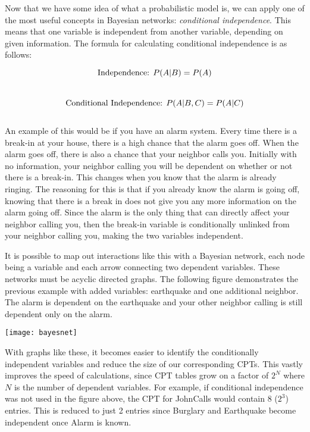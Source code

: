Now that we have some idea of what a probabilistic model is, we can apply one of the most useful concepts in Bayesian networks: \textit{conditional independence}. This means that one variable is independent from another variable, depending on given information. The formula for calculating conditional independence is as follows:\par

\begin{equation}
  \textnormal{Independence: }
  P(A|B) = P(A)
\end{equation} \\[\eqnspace]
\begin{equation}
  \textnormal{Conditional Independence: }
  P(A|B,C) = P(A|C)
\end{equation} \\[\eqnspace]

An example of this would be if you have an alarm system. Every time there is a break-in at your house, there is a high chance that the alarm goes off. When the alarm goes off, there is also a chance that your neighbor calls you. Initially with no information, your neighbor calling you will be dependent on whether or not there is a break-in. This changes when you know that the alarm is already ringing. The reasoning for this is that if you already know the alarm is going off, knowing that there is a break in does not give you any more information on the alarm going off. Since the alarm is the only thing that can directly affect your neighbor calling you, then the break-in variable is conditionally unlinked from your neighbor calling you, making the two variables independent.\par
It is possible to map out interactions like this with a Bayesian network, each node being a variable and each arrow connecting two dependent variables. These networks must be acyclic directed graphs. The following figure demonstrates the previous example with added variables: earthquake and one additional neighbor. The alarm is dependent on the earthquake and your other neighbor calling is still dependent only on the alarm.\par

\begin{center}
  \texttt{[image: bayesnet]}
\end{center}

With graphs like these, it becomes easier to identify the conditionally independent variables and reduce the size of our corresponding CPT\textquotesingle s. This vastly improves the speed of calculations, since CPT tables grow on a factor of $2^N$ where $N$ is the number of dependent variables. For example, if conditional independence was not used in the figure above, the CPT for JohnCalls would contain 8 ($2^3$) entries. This is reduced to just 2 entries since Burglary and Earthquake become independent once Alarm is known.
